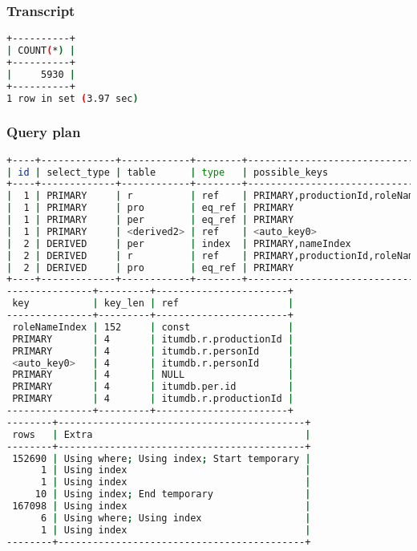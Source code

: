 \subsubsection{Transcript}
\begin{lstlisting}[language=bash]
+----------+
| COUNT(*) |
+----------+
|     5930 |
+----------+
1 row in set (3.97 sec)
\end{lstlisting}

\subsubsection{Query plan}
\begin{lstlisting}[language=bash]
+----+-------------+------------+--------+------------------------------------+
| id | select_type | table      | type   | possible_keys                      |
+----+-------------+------------+--------+------------------------------------+
|  1 | PRIMARY     | r          | ref    | PRIMARY,productionId,roleNameIndex |
|  1 | PRIMARY     | pro        | eq_ref | PRIMARY                            |
|  1 | PRIMARY     | per        | eq_ref | PRIMARY                            |
|  1 | PRIMARY     | <derived2> | ref    | <auto_key0>                        |
|  2 | DERIVED     | per        | index  | PRIMARY,nameIndex                  |
|  2 | DERIVED     | r          | ref    | PRIMARY,productionId,roleNameIndex |
|  2 | DERIVED     | pro        | eq_ref | PRIMARY                            |
+----+-------------+------------+--------+------------------------------------+
---------------+---------+-----------------------+
 key           | key_len | ref                   |
---------------+---------+-----------------------+
 roleNameIndex | 152     | const                 |
 PRIMARY       | 4       | itumdb.r.productionId |
 PRIMARY       | 4       | itumdb.r.personId     |
 <auto_key0>   | 4       | itumdb.r.personId     |
 PRIMARY       | 4       | NULL                  |
 PRIMARY       | 4       | itumdb.per.id         |
 PRIMARY       | 4       | itumdb.r.productionId |
---------------+---------+-----------------------+
--------+-------------------------------------------+
 rows   | Extra                                     |
--------+-------------------------------------------+
 152690 | Using where; Using index; Start temporary |
      1 | Using index                               |
      1 | Using index                               |
     10 | Using index; End temporary                |
 167098 | Using index                               |
      6 | Using where; Using index                  |
      1 | Using index                               |
--------+-------------------------------------------+

\end{lstlisting}

